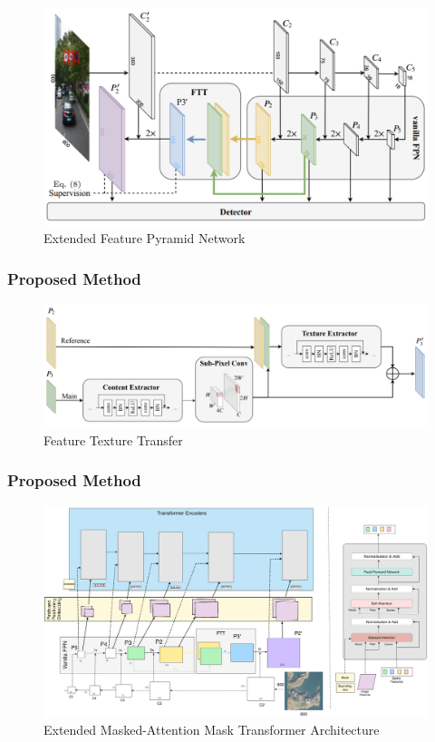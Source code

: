 \documentclass{beamer}
\begin{document}
\begin{frame}
  \begin{figure}[h!]
    \centering
    \includegraphics[scale=0.15]{Figures/efpn.jpg}
    \caption{Extended Feature Pyramid Network}
    \label{fig:efpn}
  \end{figure}
\end{frame}


\begin{frame}
  \frametitle{Proposed Method}
  \begin{figure}[h!]
    \centering
    \includegraphics[scale=0.15]{Figures/ftt.png}
    \caption{Feature Texture Transfer}
    \label{fig:ftt}
  \end{figure}
\end{frame}

\begin{frame}
  \frametitle{Proposed Method}
  \begin{figure}[h!]
    \centering
    \includegraphics[scale=0.033]{Figures/EMAMT.png}
    \caption{Extended Masked-Attention Mask Transformer Architecture}
    \label{fig:proposed-model}
  \end{figure}
\end{frame}
\end{document}
